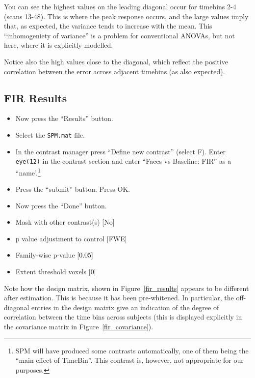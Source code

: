 You can see the highest values on the leading diagonal occur for timebins 2-4 (scans 13-48). This is where the peak response occurs, and the large values imply that, as expected, the variance tends to increase with the mean. This ``inhomogeniety of variance'' is a problem for conventional ANOVAs, but not here, where it is explicitly modelled.

Notice also the high values close to the diagonal, which reflect the positive correlation between the error across adjacent timebins (as also expected).

\subsection{FIR Results}

\begin{itemize}
\item Now press the ``Results'' button.
\item Select the \texttt{SPM.mat} file.
\item In the contrast manager press ``Define new contrast'' (select F). Enter \texttt{eye(12)} in the contrast section and enter ``Faces vs Baseline: FIR'' as a ``name'.\footnote{SPM will have produced some contrasts automatically, one of them being the ``main effect of TimeBin''. This contrast is, however, not 
appropriate for our purposes.}
\item Press the ``submit'' button. Press OK.
\item Now press the ``Done'' button.
\item Mask with other contrast(s) [No]
\item p value adjustment to control [FWE]
\item Family-wise p-value [0.05]
\item Extent threshold {voxels} [0]
\end{itemize}
Note how the design matrix, shown in Figure~\ref{fir_results} appears to be different after estimation. This is because it has been pre-whitened. In particular, the off-diagonal entries in the design matrix give an indication of the degree of correlation between the time bins across subjects (this is displayed explicitly in the covariance matrix in Figure~\ref{fir_covariance}).

